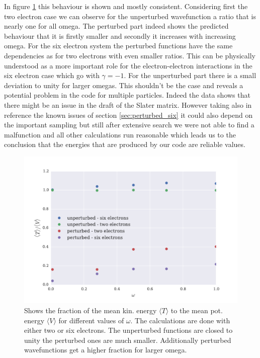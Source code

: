In figure \ref{fig:virialtheorem} this behaviour is shown and mostly consistent. Considering first the two electron case we can observe for the unperturbed wavefunction a ratio that is nearly one for all omega. The perturbed part indeed shows the predicted behaviour that it is firstly smaller and secondly it increases with increasing omega. For the six electron system the perturbed functions have the same dependencies as for two electrons with even smaller ratios. This can be physically understood as a more important role for the electron-electron interactions in the six electron case which go with $\gamma = -1$. For the unperturbed part there is a small deviation to unity for larger omegas. This shouldn't be the case and reveals a potential problem in the code for multiple particles. Indeed the data shows that there might be an issue in the draft of the Slater matrix. However taking also in reference the known issues of section \ref{sec:perturbed_six} it could also depend on the important sampling but still after extensive search we were not able to find a malfunction and all other calculations run reasonable which leads us to the conclusion that the energies that are produced by our code are reliable values.  
\begin{figure}[htbp]
    \centering
    \includegraphics[scale=0.65]{virialtheorem}
    \caption{Shows the fraction of the mean kin. energy $\langle T \rangle$ to the mean pot. energy $\langle V \rangle$ for different values of $\omega$. The calculations are done with either two or six electrons. The unperturbed functions are closed to unity the perturbed ones are much smaller. Additionally perturbed wavefunctions get a higher fraction for larger omega.}
    \label{fig:virialtheorem}
\end{figure}

